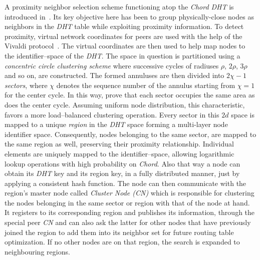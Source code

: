 A proximity neighbor selection scheme functioning atop 
the \emph{Chord DHT} is introduced in~\cite{DLTZZ2006}.
Its key objective here has been to group physically-close nodes as 
neighbors in the \emph{DHT} table while exploiting proximity information.
To detect proximity, virtual network coordinates for 
peers are used with the help of the Vivaldi protocol~\cite{cox_vivaldi_2004}. 
The virtual coordinates are then used to help map nodes to 
the identifier--space of the \emph{DHT}.
The space in question is partitioned using a 
\emph{concentric circle clustering scheme} where successive cycles of
radiuses $\rho$, $2\rho$, $3\rho$ and so on, are constructed. 
The formed annuluses are then divided into 
$2\chi-1$ \emph{sectors}, where $\chi$ denotes the
sequence number of the annulus starting from $\chi = 1$ 
for the center cycle. 
In this way, 
\cite{DLTZZ2006} prove that each sector
occupies the same area as does the center cycle. 
Assuming uniform node distribution, this characteristic,
favors a more load--balanced clustering operation. 
Every sector in this $2d$ space is mapped to 
a unique \emph{region} in the \emph{DHT} space forming a
multi-layer node identifier space.  
Consequently, nodes belonging to the same
sector, are mapped to the same region as well, preserving their proximity
relationship. Individual elements are uniquely mapped to the identifier--space,
allowing logarithmic lookup operations with high 
probability on \emph{Chord}. Also that way a node can obtain its \emph{DHT}
key and its region key, in a fully distributed manner, just by applying a
consistent hash function. The node can then communicate with the region's
master node called \emph{Cluster Node (CN)} which is responsible for clustering 
the nodes belonging in the same sector or region with that of the node at hand. 
It registers to its corresponding region and publishes its information, through
the special peer \emph{CN} and can also ask the latter for other
nodes that have previously joined the region to add them into its
neighbor set for future routing table optimization.
%
If no other nodes are on that region, the search is expanded to neighbouring
regions.
%
